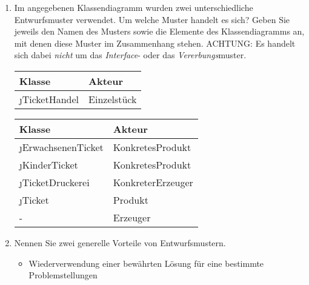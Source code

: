 \documentclass{bschlangaul-aufgabe}
\begin{document}
\begin{enumerate}


\item Im angegebenen Klassendiagramm wurden zwei unterschiedliche
Entwurfsmuster verwendet. Um welche Muster handelt es sich? Geben Sie
jeweils den Namen des Musters sowie die Elemente des Klassendiagramms
an, mit denen diese Muster im Zusammenhang stehen. ACHTUNG: Es handelt
sich dabei \emph{nicht} um das \emph{Interface}- oder das
\emph{Vererbungs}muster.

\begin{bAntwort}

\bEntwurfsEinzelstueckUml
\bEntwurfsEinzelstueckAkteure

\begin{tabular}{l|l}
\textbf{Klasse}       & \textbf{Akteur} \\\hline\hline
\j{TicketHandel}      & Einzelstück\\
\end{tabular}


\bEntwurfsFabrikmethodeUml
\bEntwurfsFabrikmethodeAkteure

\begin{tabular}{l|l}
\textbf{Klasse}       & \textbf{Akteur} \\\hline\hline
\j{ErwachsenenTicket} & KonkretesProdukt\\
\j{KinderTicket}      & KonkretesProdukt\\
\j{TicketDruckerei}   & KonkreterErzeuger\\
\j{Ticket}            & Produkt\\
-                     & Erzeuger\\
\end{tabular}
\end{bAntwort}


\item Nennen Sie zwei generelle Vorteile von Entwurfsmustern.

\begin{bAntwort}
\begin{itemize}
\item Wiederverwendung einer bewährten Lösung für eine bestimmte
Problemstellungen


\end{itemize}
\end{bAntwort}
\end{enumerate}
\end{document}

